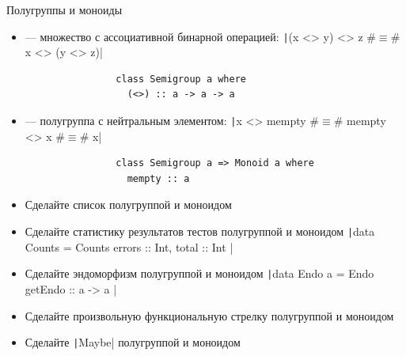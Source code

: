     \begin{frame}[fragile]{Полугруппы и моноиды}
        \begin{itemize}
            \item[\defi]  --- множество с ассоциативной бинарной операцией: \texttt|(x <> y) <> z #$\equiv$# x <> (y <> z)|
            \begin{verbatim}
                class Semigroup a where
                  (<>) :: a -> a -> a
            \end{verbatim}
            \item[\defi]  --- полугруппа с нейтральным элементом: \texttt|x <> mempty #$\equiv$# mempty <> x #$\equiv$# x|
            \begin{verbatim}
                class Semigroup a => Monoid a where
                  mempty :: a
            \end{verbatim}
            \item[\todo] Сделайте список полугруппой и моноидом
            \item[\todo] Сделайте статистику результатов тестов полугруппой и моноидом
            \texttt|data Counts = Counts { errors :: Int, total :: Int }|
            \item[\todo] Сделайте эндоморфизм полугруппой и моноидом
            \texttt|data Endo a = Endo { getEndo :: a -> a }|
            \item[\todo] Сделайте произвольную функциональную стрелку полугруппой и моноидом
            \item[\todo] Сделайте \texttt|Maybe| полугруппой и моноидом
        \end{itemize}
    \end{frame}

